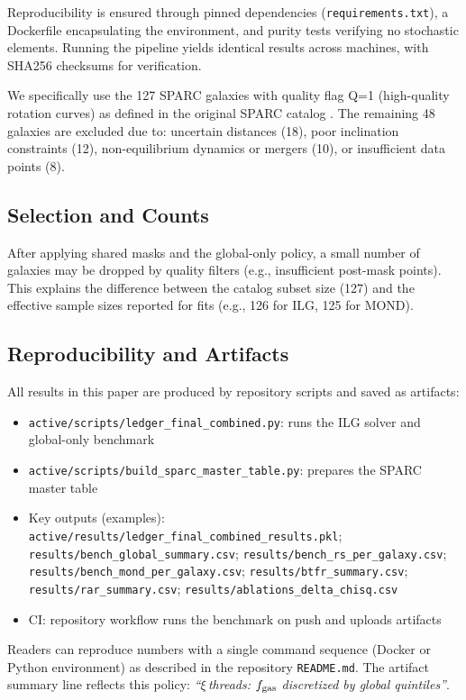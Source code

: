 \documentclass[12pt,a4paper]{article}
\begin{document}
Reproducibility is ensured through pinned dependencies (\texttt{requirements.txt}), a Dockerfile encapsulating the environment, and purity tests verifying no stochastic elements. Running the pipeline yields identical results across machines, with SHA256 checksums for verification.

We specifically use the 127 SPARC galaxies with quality flag Q=1 (high-quality rotation curves) as defined in the original SPARC catalog \citep{lelli2016sparc}. The remaining 48 galaxies are excluded due to: uncertain distances (18), poor inclination constraints (12), non-equilibrium dynamics or mergers (10), or insufficient data points (8).

\subsection{Selection and Counts}
\noindent After applying shared masks and the global-only policy, a small number of galaxies may be dropped by quality filters (e.g., insufficient post-mask points). This explains the difference between the catalog subset size (127) and the effective sample sizes reported for fits (e.g., 126 for ILG, 125 for MOND).

\subsection{Reproducibility and Artifacts}

All results in this paper are produced by repository scripts and saved as artifacts:
\begin{itemize}
  \item \texttt{active/scripts/ledger\_final\_combined.py}: runs the ILG solver and global-only benchmark
  \item \texttt{active/scripts/build\_sparc\_master\_table.py}: prepares the SPARC master table
  \item Key outputs (examples): \texttt{active/results/ledger\_final\_combined\_results.pkl}; \texttt{results/bench\_global\_summary.csv}; \texttt{results/bench\_rs\_per\_galaxy.csv}; \texttt{results/bench\_mond\_per\_galaxy.csv}; \texttt{results/btfr\_summary.csv}; \texttt{results/rar\_summary.csv}; \texttt{results/ablations\_delta\_chisq.csv}
  \item CI: repository workflow runs the benchmark on push and uploads artifacts
\end{itemize}

Readers can reproduce numbers with a single command sequence (Docker or Python environment) as described in the repository \texttt{README.md}. The artifact summary line reflects this policy: \emph{``$\xi$\,threads: $f_{\rm gas}$ discretized by global quintiles''}.
\end{document}
